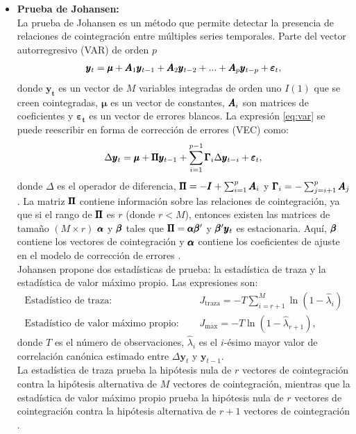\documentclass[12pt]{article}
\begin{document}
\begin{itemize}
    \item \textbf{Prueba de Johansen:}\\
    La prueba de Johansen es un método que permite detectar la presencia de relaciones de cointegración entre múltiples series temporales.
    Parte del vector autorregresivo (VAR) de orden $p$ 
    \begin{align}
        \pmb{y}_t = \pmb{\mu} + \pmb{A}_1 \pmb{y}_{t-1} + \pmb{A}_2 \pmb{y}_{t-2} + ... + \pmb{A}_p \pmb{y}_{t-p} + \pmb{\varepsilon}_t,
        \label{eq:var}
    \end{align}
    donde $\pmb{y_t}$ es un vector de $M$ variables integradas de orden uno $I(1)$ que se creen cointegradas,
    $\pmb{\mu}$ es un vector de constantes, $\pmb{A}_i$ son matrices de coeficientes y 
    $\pmb{\varepsilon_t}$ es un vector de errores blancos. La expresión \eqref{eq:var} se puede reescribir 
    en forma de corrección de errores (VEC) como:
    \begin{align}
        \Delta \pmb{y}_t = \pmb{\mu} + \pmb{\Pi} \pmb{y}_{t-1}+ \sum_{i=1}^{p-1} \pmb{\Gamma}_i \Delta \pmb{y}_{t-i} + \pmb{\varepsilon}_t,
    \end{align}
    donde $\Delta$ es el operador de diferencia, $\pmb{\Pi} = -\pmb{I} + \sum_{i=1}^{p} \pmb{A}_i$ y
    $\pmb{\Gamma}_i = -\sum_{j=i+1}^{p} \pmb{A}_j$. La matriz $\pmb{\Pi}$ contiene información sobre las relaciones de cointegración, ya que
    si el rango de $\pmb{\Pi}$ es $r$ (donde $r < M$), entonces existen las matrices  de tamaño $(M \times r)$ $\pmb{\alpha}$ y $\pmb{\beta}$ 
    tales que $\pmb{\Pi} = \pmb{\alpha} \pmb{\beta}'$ y $\pmb{\beta}' \pmb{y}_t$ es estacionaria. Aquí, $\pmb{\beta}$ contiene los vectores de cointegración y $\pmb{\alpha}$ 
    contiene los coeficientes de ajuste en el modelo de corrección de errores \cite{Osterholm2007Testing}.\\
    Johansen propone dos estadísticas de prueba: la estadística de traza y la estadística de valor máximo propio. Las expresiones son:
    \begin{align}
        \text{Estadístico de traza: } & \quad J_{\text{traza}} = -T \sum_{i=r+1}^{M} \ln(1 - \hat{\lambda}_i) \\
        \text{Estadístico de valor máximo propio: } & \quad J_{\text{max}} = -T \ln(1 - \hat{\lambda}_{r+1}),
    \end{align}
    donde $T$ es el número de observaciones, $\hat{\lambda}_i$ es el $i$-ésimo mayor valor de correlación canónica estimado entre $\Delta \pmb{y}_t$ y $\pmb{y}_{t-1}$.\\
    La estadística de traza prueba la hipótesis nula de $r$ vectores de cointegración contra 
    la hipótesis alternativa de $M$ vectores de cointegración, mientras que la estadística de valor máximo propio prueba la hipótesis nula de $r$ vectores de cointegración
    contra la hipótesis alternativa de $r+1$ vectores de cointegración \cite{Osterholm2007Testing}.


\end{itemize}
\end{document}
